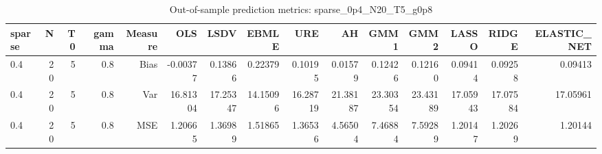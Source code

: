 \begin{table}[!htbp]\centering
\caption{Out-of-sample prediction metrics: sparse_0p4_N20_T5_g0p8}
\label{tab:table3_sparse_0p4_N20_T5_g0p8}
\begin{tabular}{lrrrrrrrrrrrrrr}
\hline
sparse & N & T0 & gamma & Measure & OLS & LSDV & EBMLE & URE & AH & GMM1 & GMM2 & LASSO & RIDGE & ELASTIC_NET \\
\hline
0.4 & 20 & 5 & 0.8 & Bias & -0.00377 & 0.13866 & 0.22379 & 0.10195 & 0.01579 & 0.12426 & 0.12160 & 0.09414 & 0.09258 & 0.09413 \\
0.4 & 20 & 5 & 0.8 & Var & 16.81304 & 17.25347 & 14.15096 & 16.28719 & 21.38187 & 23.30354 & 23.43189 & 17.05943 & 17.07584 & 17.05961 \\
0.4 & 20 & 5 & 0.8 & MSE & 1.20665 & 1.36989 & 1.51865 & 1.36536 & 4.56504 & 7.46884 & 7.59289 & 1.20147 & 1.20269 & 1.20144 \\
\hline
\end{tabular}
\end{table}

